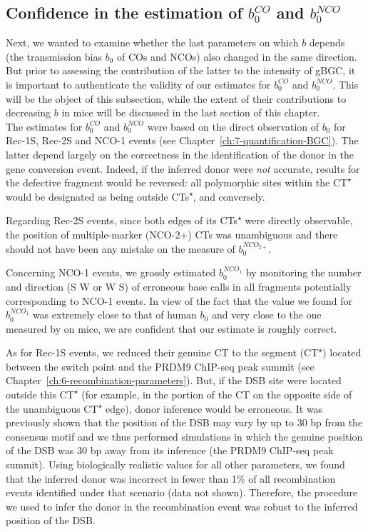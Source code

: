 \subsection{Confidence in the estimation of $b_{0}^{CO}$ and $b_{0}^{NCO}$}

Next, we wanted to examine whether the last parameters on which $b$ depends (the transmission bias $b_0$ of COs and NCOs) also changed in the same direction.
But prior to assessing the contribution of the latter to the intensity of gBGC, it is important to authenticate the validity of our estimates for $b_{0}^{CO}$ and $b_{0}^{NCO}$.
This will be the object of this subsection, while the extent of their contributions to decreasing $b$ in mice will be discussed in the last section of this chapter.\\

The estimates for $b_{0}^{CO}$ and $b_{0}^{NCO}$ were based on the direct observation of $b_0$ for Rec-1S, Rec-2S and NCO-1 events (see Chapter~\ref{ch:7-quantification-BGC}).
The latter depend largely on the correctness in the identification of the donor in the gene conversion event.
Indeed, if the inferred donor were \textit{not} accurate, results for the defective fragment would be reversed: all polymorphic sites within the CT\textsuperscript{$\star$} would be designated as being outside CTs\textsuperscript{$\star$}, and conversely.

Regarding Rec-2S events, since both edges of its CTs\textsuperscript{$\star$} were directly observable, the position of multiple-marker (NCO-2+) CTs was unambiguous and there should not have been any mistake on the measure of $b_0^{NCO_{2+}}$.

Concerning NCO-1 events, we grossly estimated $b_0^{NCO_1}$ by monitoring the number and direction (S\textrightarrow{} W or W\textrightarrow{} S) of erroneous base calls in all fragments potentially corresponding to NCO-1 events.
In view of the fact that the value we found for $b_0^{NCO_1}$ was extremely close to that of human $b_0$ \citep{williams2015noncrossover,halldorsson2016rate} and very close to the one measured by \citet{li2018highresolution} on mice, we are confident that our estimate is roughly correct.

As for Rec-1S events, we reduced their genuine CT to the segment (CT\textsuperscript{$\star$}) located between the switch point and the PRDM9 ChIP-seq peak summit (see Chapter~\ref{ch:6-recombination-parameters}).
But, if the DSB site were located outside this CT\textsuperscript{$\star$} (for example, in the portion of the CT on the opposite side of the unambiguous CT\textsuperscript{$\star$} edge), donor inference would be erroneous.
It was previously shown that the position of the DSB may vary by up to 30 bp from the consensus motif \citep{lange2016landscape} and we thus performed simulations in which the genuine position of the DSB was 30 bp away from its inference (the PRDM9 ChIP-seq peak summit).
Using biologically realistic values for all other parameters, we found that the inferred donor was incorrect in fewer than 1\% of all recombination events identified under that scenario (data not shown).
Therefore, the procedure we used to infer the donor in the recombination event was robust to the inferred position of the DSB\@.

